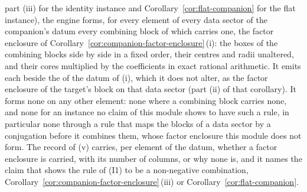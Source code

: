 \begin{requirement}
\begin{enumerate}[label=(\roman*),leftmargin=2.4em]
  part (iii) for the identity instance and
  Corollary~\ref{cor:flat-companion} for the flat instance), the engine
  forms, for every element of every data sector of the companion's datum
  every combining block of which carries one, the factor enclosure of
  Corollary~\ref{cor:companion-factor-enclosure}\,(i): the boxes of the
  combining blocks side by side in a fixed order, their centres and radii
  unaltered, and their cores multiplied by the coefficients in exact rational
  arithmetic. It emits each beside the  of the
  datum of (i), which it does not alter, as the factor enclosure of the target's block
  on that data sector (part (ii) of that corollary). It forms none on any other
  element: none where a combining block carries none, and none for an
  instance no claim of this module shows to have such a rule, in particular
  none through a rule that maps the blocks of a data sector by a conjugation
  before it combines them, whose factor enclosure this module does not form.
  The record of (v) carries, per element of the datum, whether a factor
  enclosure is carried, with its number of columns, or why none is, and it
  names the claim that shows the rule of (I1) to be a non-negative
  combination, Corollary~\ref{cor:companion-factor-enclosure}\,(iii) or
  Corollary~\ref{cor:flat-companion}.
\end{enumerate}
\end{requirement}
